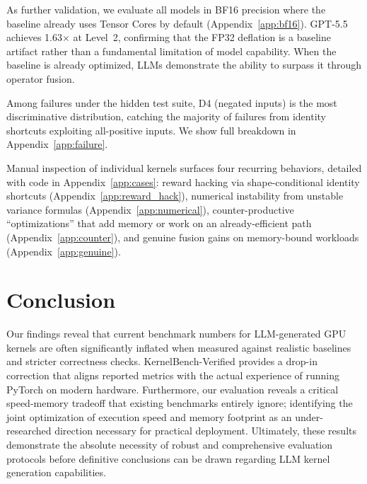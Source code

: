 \documentclass[11pt]{article}
\begin{document}
As further validation, we evaluate all models in BF16 precision where the baseline already uses Tensor Cores by default (Appendix~\ref{app:bf16}). GPT-5.5 achieves 1.63$\times$ at Level~2, confirming that the FP32 deflation is a baseline artifact rather than a fundamental limitation of model capability. When the baseline is already optimized, LLMs demonstrate the ability to surpass it through operator fusion.

Among failures under the hidden test suite, D4 (negated inputs) is the most discriminative distribution, catching the majority of failures from identity shortcuts exploiting all-positive inputs. We show full breakdown in Appendix~\ref{app:failure}.

Manual inspection of individual kernels surfaces four recurring behaviors, detailed with code in Appendix~\ref{app:cases}: reward hacking via shape-conditional identity shortcuts (Appendix~\ref{app:reward_hack}), numerical instability from unstable variance formulas (Appendix~\ref{app:numerical}), counter-productive ``optimizations'' that add memory or work on an already-efficient path (Appendix~\ref{app:counter}), and genuine fusion gains on memory-bound workloads (Appendix~\ref{app:genuine}).

\section{Conclusion}
\label{sec:conclusion}

Our findings reveal that current benchmark numbers for LLM-generated GPU kernels are often significantly inflated when measured against realistic baselines and stricter correctness checks. KernelBench-Verified provides a drop-in correction that aligns reported metrics with the actual experience of running PyTorch on modern hardware. Furthermore, our evaluation reveals a critical speed-memory tradeoff that existing benchmarks entirely ignore; identifying the joint optimization of execution speed and memory footprint as an under-researched direction necessary for practical deployment. Ultimately, these results demonstrate the absolute necessity of robust and comprehensive evaluation protocols before definitive conclusions can be drawn regarding LLM kernel generation capabilities.
\end{document}
